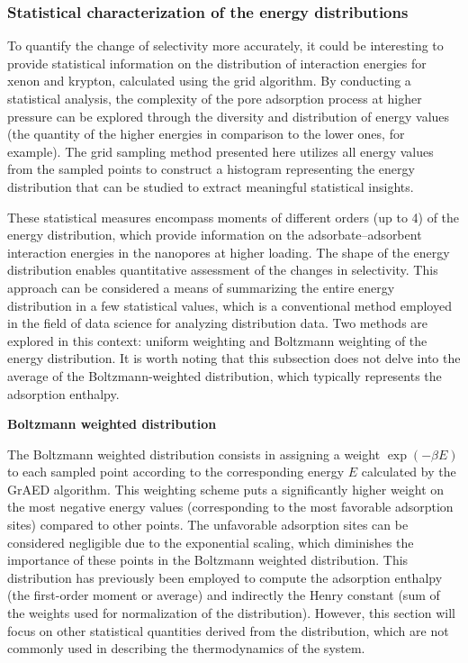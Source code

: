 \documentclass[main]{subfiles}
\begin{document}
\subsubsection{Statistical characterization of the energy distributions}

To quantify the change of selectivity more accurately, it could be interesting to provide statistical information on the distribution of interaction energies for xenon and krypton, calculated using the grid algorithm. By conducting a statistical analysis, the complexity of the pore adsorption process at higher pressure can be explored through the diversity and distribution of energy values (the quantity of the higher energies in comparison to the lower ones, for example). The grid sampling method presented here utilizes all energy values from the sampled points to construct a histogram representing the energy distribution that can be studied to extract meaningful statistical insights.

These statistical measures encompass moments of different orders (up to 4) of the energy distribution, which provide information on the adsorbate--adsorbent interaction energies in the nanopores at higher loading. The shape of the energy distribution enables quantitative assessment of the changes in selectivity. This approach can be considered a means of summarizing the entire energy distribution in a few statistical values, which is a conventional method employed in the field of data science for analyzing distribution data. Two methods are explored in this context: uniform weighting and Boltzmann weighting of the energy distribution. It is worth noting that this subsection does not delve into the average of the Boltzmann-weighted distribution, which typically represents the adsorption enthalpy.

\textbf{Boltzmann weighted distribution}

The Boltzmann weighted distribution consists in assigning a weight $\exp(-\beta E)$ to each sampled point according to the corresponding energy $E$ calculated by the GrAED algorithm. This weighting scheme puts a significantly higher weight on the most negative energy values (corresponding to the most favorable adsorption sites) compared to other points. The unfavorable adsorption sites can be considered negligible due to the exponential scaling, which diminishes the importance of these points in the Boltzmann weighted distribution. This distribution has previously been employed to compute the adsorption enthalpy (the first-order moment or average) and indirectly the Henry constant (sum of the weights used for normalization of the distribution). However, this section will focus on other statistical quantities derived from the distribution, which are not commonly used in describing the thermodynamics of the system.
\end{document}
